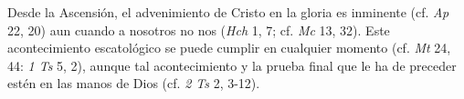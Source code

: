 
 Desde la Ascensión, el advenimiento de Cristo en la gloria es inminente (cf. \emph{Ap} 22, 20) aun cuando a nosotros no nos  (\emph{Hch} 1, 7; cf. \emph{Mc} 13, 32). Este acontecimiento escatológico se puede cumplir en cualquier momento (cf. \emph{Mt} 24, 44: \emph{1 Ts} 5, 2), aunque tal acontecimiento y la prueba final que le ha de preceder estén  en las manos de Dios (cf. \emph{2 Ts} 2, 3-12).